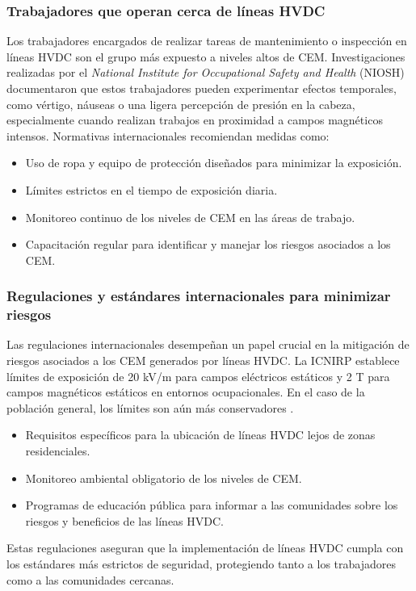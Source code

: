 \subsubsection{Trabajadores que operan cerca de líneas HVDC}

Los trabajadores encargados de realizar tareas de mantenimiento o inspección en líneas HVDC son el grupo más expuesto a niveles altos de CEM. Investigaciones realizadas por el \textit{National Institute for Occupational Safety and Health} (NIOSH) documentaron que estos trabajadores pueden experimentar efectos temporales, como vértigo, náuseas o una ligera percepción de presión en la cabeza, especialmente cuando realizan trabajos en proximidad a campos magnéticos intensos. Normativas internacionales recomiendan medidas como:
\begin{itemize}
    \item Uso de ropa y equipo de protección diseñados para minimizar la exposición.
    \item Límites estrictos en el tiempo de exposición diaria.
    \item Monitoreo continuo de los niveles de CEM en las áreas de trabajo.
    \item Capacitación regular para identificar y manejar los riesgos asociados a los CEM.
\end{itemize}

\subsubsection{Regulaciones y estándares internacionales para minimizar riesgos}

Las regulaciones internacionales desempeñan un papel crucial en la mitigación de riesgos asociados a los CEM generados por líneas HVDC. La ICNIRP establece límites de exposición de 20 kV/m para campos eléctricos estáticos y 2 T para campos magnéticos estáticos en entornos ocupacionales. En el caso de la población general, los límites son aún más conservadores \cite{ICNIRP2020Guidelines}.
\begin{itemize}
    \item Requisitos específicos para la ubicación de líneas HVDC lejos de zonas residenciales.
    \item Monitoreo ambiental obligatorio de los niveles de CEM.
    \item Programas de educación pública para informar a las comunidades sobre los riesgos y beneficios de las líneas HVDC.
\end{itemize}
Estas regulaciones aseguran que la implementación de líneas HVDC cumpla con los estándares más estrictos de seguridad, protegiendo tanto a los trabajadores como a las comunidades cercanas.

